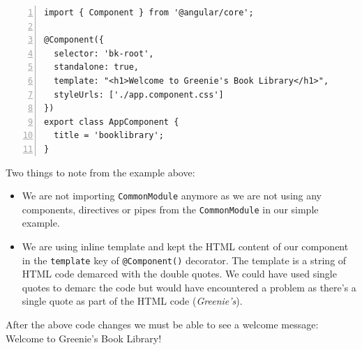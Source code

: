 \documentclass{report}
\begin{document}
\begin{Verbatim}[numbers=left]
import { Component } from '@angular/core';

@Component({
  selector: 'bk-root',
  standalone: true,
  template: "<h1>Welcome to Greenie's Book Library</h1>",
  styleUrls: ['./app.component.css']
})
export class AppComponent {
  title = 'booklibrary';
}
\end{Verbatim}

Two things to note from the example above:
\begin{itemize}
\item We are not importing \verb|CommonModule| anymore as we are not using any components, directives or pipes from the \verb|CommonModule| in our simple example.
\item We are using inline template and kept the HTML content of our component in the \verb|template| key of \verb|@Component()| decorator. The template is a string of HTML code demarced with the double quotes. We could have used single quotes to demarc the code but would have encountered a problem as there's a single quote as part of the HTML code (\textsl{Greenie's}).
\end{itemize}

After the above code changes we must be able to see a welcome message: Welcome to Greenie's Book Library!
\end{document}
